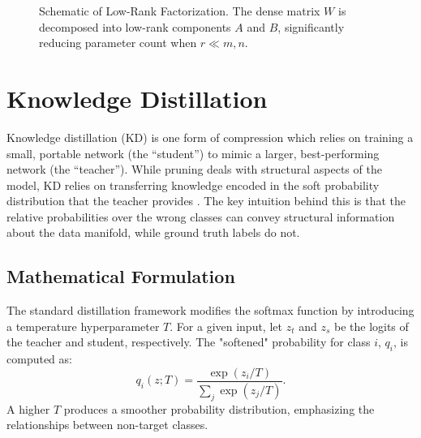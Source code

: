 \begin{figure}[htbp]
  \centering
  \caption{Schematic of Low-Rank Factorization. The dense matrix $W$ is decomposed into low-rank components $A$ and $B$, significantly reducing parameter count when $r \ll m, n$.}
  \label{fig:lowrank_concept}
\end{figure}

\section{Knowledge Distillation}

Knowledge distillation (KD) is one form of compression which relies on training a small, portable network (the ``student'') to mimic a larger, best-performing network (the ``teacher''). While pruning deals with structural aspects of the model, KD relies on transferring knowledge encoded in the soft probability distribution that the teacher provides \cite{hinton2015distilling}. The key intuition behind this is that the relative probabilities over the wrong classes can convey structural information about the data manifold, while ground truth labels do not.

\subsection{Mathematical Formulation}

The standard distillation framework modifies the softmax function by introducing a temperature hyperparameter $T$. For a given input, let $z_t$ and $z_s$ be the logits of the teacher and student, respectively. The "softened" probability for class $i$, $q_i$, is computed as:
\begin{equation}
    q_i(z; T) = \frac{\exp(z_i / T)}{\sum_j \exp(z_j / T)}.
    \label{eq:softmax_temp}
\end{equation}
A higher $T$ produces a smoother probability distribution, emphasizing the relationships between non-target classes.

